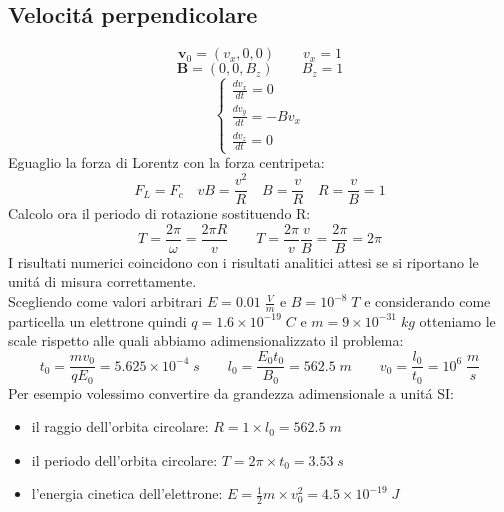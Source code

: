 \subsection{Velocitá perpendicolare}
$$\mathbf{v}_0=(v_x,0,0) \qquad v_x=1 $$
$$\mathbf{B}=(0,0,B_z) \qquad B_z=1$$
$$
\begin{cases} 
\frac{dv_x}{dt}= 0  \\ 
\frac{dv_y}{dt}= - Bv_x\\ 
\frac{dv_z}{dt}=0 
\end{cases}
$$
Eguaglio la forza di Lorentz con la forza centripeta:
$$F_L=F_c \quad vB=\frac{v^2}{R} \quad B=\frac{v}{R} \quad R=\frac{v}{B}=1$$
Calcolo ora il periodo di rotazione sostituendo R:
$$T=\frac{2\pi}{\omega}=\frac{2\pi R}{v} \qquad T=\frac{2\pi}{v}\frac{v}{B} = \frac{2\pi}{B} = 2\pi$$
I risultati numerici coincidono con i risultati analitici attesi se si riportano le unitá di misura correttamente. \\
Scegliendo come valori arbitrari $E = 0.01 \; \frac{V}{m}$ e $B = 10^{-8} \; T $ e considerando come particella un elettrone quindi  $q = 1.6 \times 10^{-19} \;C $ e $m = 9 \times 10^{-31} \; kg$ otteniamo le scale rispetto alle quali abbiamo adimensionalizzato il problema:
 $$t_0 = \frac{m  v_0}  {q  E_0} =  5.625 \times 10^{-4} \; s  \qquad l_0 = \frac{E_0t_0}{B_0} = 562.5 \; m  \qquad v_0 = \frac{l_0}{t_0} = 10^6 \; \frac{m}{s}$$
Per esempio volessimo convertire da grandezza adimensionale a unitá SI:
\begin{itemize}
\item il raggio dell'orbita circolare: $R = 1 \times l_0 = 562.5 \; m $
\item il periodo dell'orbita circolare: $T = 2\pi \times t_0 = 3.53 \; s $
\item l'energia cinetica dell'elettrone: $ E = \frac{1}{2}m \times v_0^2 = 4.5 \times 10^{-19} \;J$
\end{itemize}

